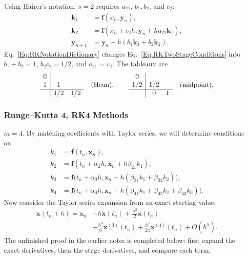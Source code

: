 Using Hairer's notation, $s=2$ requires $a_{21}$, $b_1,b_2$, and $c_2$:
\[
\begin{aligned}
 \mathbf k_1&=\mathbf f(x_n,\mathbf y_n),\\
 \mathbf k_2&=\mathbf f(x_n+c_2h,\mathbf y_n+ha_{21}\mathbf k_1),\\
 \mathbf y_{n+1}&=\mathbf y_n+h(b_1\mathbf k_1+b_2\mathbf k_2).
\end{aligned}
\]
Eq.~\ref{Eq:RKNotationDictionary} changes
Eq.~\ref{Eq:RKTwoStageConditions} into
$b_1+b_2=1$, $b_2c_2=1/2$, and $a_{21}=c_2$.
The tableaux are
\[
 \begin{array}{c|cc}0&&\\1&1&\\\hline&1/2&1/2\end{array}
 \quad\text{(Heun)},\qquad
 \begin{array}{c|cc}0&&\\1/2&1/2&\\\hline&0&1\end{array}
 \quad\text{(midpoint)}.
\]

\subsubsection{Runge--Kutta 4, RK4 Methods}

$m=4$. By matching coefficients with Taylor series, we will determine
conditions on
\begin{equation}\label{Eq:RKFourStagesAppendix}
\begin{aligned}
 k_1&=\mathbf f(t_n,\mathbf x_n),\\
 k_2&=\mathbf f(t_n+\alpha_2h,\mathbf x_n+h\beta_{21}k_1),\\
 k_3&=\mathbf f\bigl(t_n+\alpha_3h,
                   \mathbf x_n+h(\beta_{31}k_1+\beta_{32}k_2)\bigr),\\
 k_4&=\mathbf f\bigl(t_n+\alpha_4h,
           \mathbf x_n+h(\beta_{41}k_1+\beta_{42}k_2+\beta_{43}k_3)\bigr).
\end{aligned}
\end{equation}
Now consider the Taylor series expansion from an exact starting value:
\begin{equation}\label{Eq:RKExactFourthOrder}
\begin{aligned}
 \mathbf x(t_n+h)=\mathbf x_n
 &+h\dot{\mathbf x}(t_n)+\frac{h^2}{2}\ddot{\mathbf x}(t_n)\\
 &+\frac{h^3}{6}\mathbf x^{(3)}(t_n)
  +\frac{h^4}{24}\mathbf x^{(4)}(t_n)+O(h^5).
\end{aligned}
\end{equation}
The unfinished proof in the earlier notes is completed below: first expand
the exact derivatives, then the stage derivatives, and compare each term.

